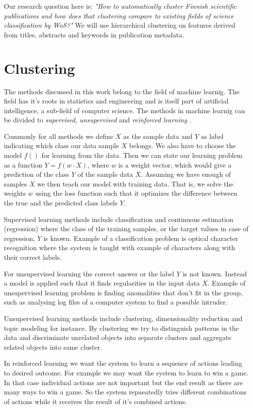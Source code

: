 Our research question here is: \emph{"How to automatically cluster 
Finnish scientific publications and how does that clustering 
compare to existing fields of science classification by WoS?"} We 
will use hierarchical clustering on features derived from titles,
abstracts and keywords in publication metadata.


\section{Clustering}
The methods discussed in this work belong to the field of machine 
learnig. The field has it's roots in statistics and engineering 
and is itself part of artificial intelligence, a sub-field of 
computer science.
The methods in machine learnig can be divided to \emph{supervised}, 
\emph{unsupervised} and \emph{reinforced learning}
\cite{alpaydin2004introduction}.

Commonly for all methods we define $X$ as
the sample data and $Y$ as label indicating which class our data 
sample $X$ belongs. We also have to choose the model $f()$ for
learning from the data. Then we can state our learning problem as
a function $Y = f(w \cdot X)$, where $w$ is a weight vector, 
which would give a prediction of the class $Y$ of the sample data
$X$. 
Assuming we have enough of samples $X$ we then teach our model 
with training data. That is, we solve the weights $w$ using the
loss function such that it optimizes the difference between the 
true and the predicted class labels $Y$.

Supervised learning methods include classification and continuous 
estimation (regression)
where the class of the training samples, or the target values in 
case of regression, $Y$ is known. Example of a classification 
problem is optical character recognition where the system is 
taught with example of characters along with their correct labels.

For unsupervised learning the correct answer or the label $Y$ is not known. 
Instead a model is applied such that it finds regularities in the
input data $X$. Example of unsupervised learning problem is 
finding anomalities that don't fit in the group, such as analysing
log files of a computer system to find a possible intruder.

Unsupervised learning methods include clustering, dimensionality
reduction and topic modeling for instance. By clustering we try to 
distinguish patterns in the data and discriminate unrelated 
objects into separate clusters and aggregate related objects into
same cluster.

In reinforced learning we want the system to learn a sequence of
actions leading to desired outcome. For example we may want the 
system to learn to win a game. In that case individual actions
are not important but the end result as there are many ways to win
a game. So the system repaeatedly tries different combinations of
actions while it receives the result of it's combined actions.



